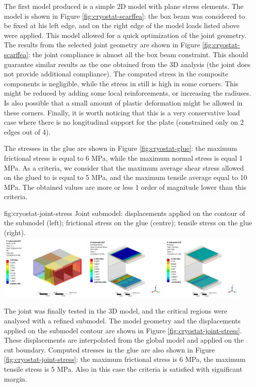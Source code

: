 The first model produced is a simple 2D model with plane stress elements. The model is shown in Figure \ref{fig:cryostat-scarffea}: the box beam was considered to be fixed at his left edge, and on the right edge of the model loads listed above were applied. This model allowed for a quick optimization of the joint geometry. The results from the selected joint geometry are shown in Figure \ref{fig:cryostat-scarffea}: the joint compliance is almost all the box beam constraint. This should guarantee similar results as the one obtained from the 3D analysis (the joint does not provide additional compliance). The computed stress in the composite components is negligible, while the stress in still is high in some corners. This might be reduced by adding some local reinforcements, or increasing the radiuses. Is also possible that a small amount of plastic deformation might be allowed in these corners. Finally, it is worth noticing that this is a very conservative load case where there is no longitudinal support for the plate (constrained only on 2 edges out of 4).

The stresses in the glue are shown in Figure \ref{fig:cryostat-glue}: the maximum frictional stress is equal to 6 MPa, while the maximum normal stress is equal 1 MPa. As a criteria, we consider that the maximum average shear stress allowed on the glued to is equal to 5 MPa, and the maximum tensile average equal to 10 MPa. The obtained values are more or less 1 order of magnitude lower than this criteria.

\begin{dunefigure}{fig:cryostat-joint-stress}
{Joint submodel: displacements applied on the contour of the submodel (left); frictional stress on the glue (centre); tensile stress on the glue (right).}
\includegraphics[width=0.95\textwidth]{graphics/cryostat/cryostat-joint-stress.png}
\end{dunefigure}

The joint was finally tested in the 3D model, and the critical regions were analysed with a refined submodel. The model geometry and the displacements applied on the submodel contour are shown in Figure \ref{fig:cryostat-joint-stress}. These displacements are interpolated from the global model and applied on the cut boundary. Computed stresses in the glue are also shown in Figure \ref{fig:cryostat-joint-stress}: the maximum frictional stress is 6 MPa, the maximum tensile stress is 5 MPa. Also in this case the criteria is satisfied with significant margin.

